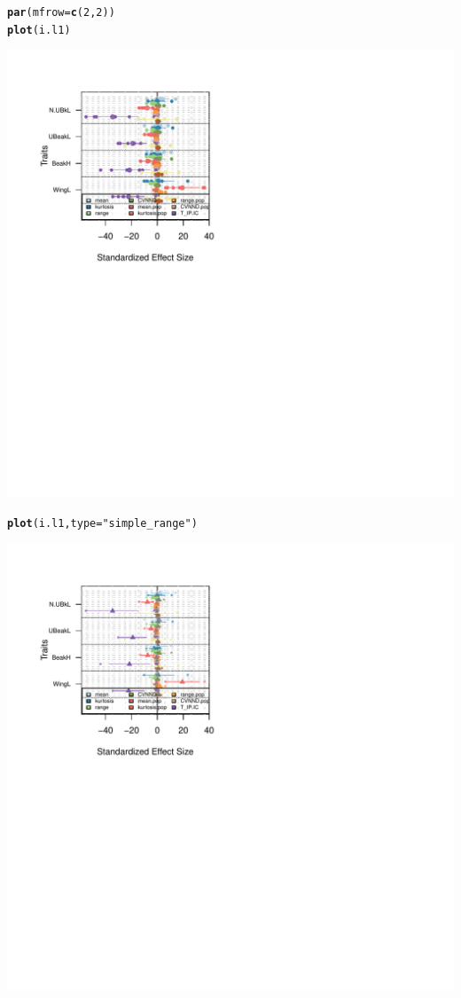 \documentclass[12pt]{article}\usepackage[]{graphicx}\usepackage[]{color}
\makeatletter
\def\maxwidth{ %
  \ifdim\Gin@nat@width>\linewidth
    \linewidth
  \else
    \Gin@nat@width
  \fi
}
\newcommand{\hlnum}[1]{\textcolor[rgb]{0.686,0.059,0.569}{#1}}%
\newcommand{\hlstr}[1]{\textcolor[rgb]{0.192,0.494,0.8}{#1}}%
\newcommand{\hlstd}[1]{\textcolor[rgb]{0.345,0.345,0.345}{#1}}%
\newcommand{\hlkwc}[1]{\textcolor[rgb]{0.333,0.667,0.333}{#1}}%
\newcommand{\hlkwd}[1]{\textcolor[rgb]{0.737,0.353,0.396}{\textbf{#1}}}%
\newenvironment{kframe}{%
 \def\at@end@of@kframe{}%
 \ifinner\ifhmode%
  \def\at@end@of@kframe{\end{minipage}}%
  \begin{minipage}{\columnwidth}%
 \fi\fi%
 \def\FrameCommand##1{\hskip\@totalleftmargin \hskip-\fboxsep
 \colorbox{shadecolor}{##1}\hskip-\fboxsep
     \hskip-\linewidth \hskip-\@totalleftmargin \hskip\columnwidth}%
 \MakeFramed {\advance\hsize-\width
   \@totalleftmargin\z@ \linewidth\hsize
   \@setminipage}}%
 {\par\unskip\endMakeFramed%
 \at@end@of@kframe}
\newenvironment{knitrout}{}{} %
\makeatother
\begin{document}
\begin{knitrout}
\color{fgcolor}\begin{kframe}
\begin{alltt}
\hlkwd{par}\hlstd{(}\hlkwc{mfrow} \hlstd{=} \hlkwd{c}\hlstd{(}\hlnum{2}\hlstd{,}\hlnum{2}\hlstd{))}
\hlkwd{plot}\hlstd{(i.l1)}
\end{alltt}
\end{kframe}
\includegraphics[width=\maxwidth]{figure/unnamed-chunk-501} 
\begin{kframe}\begin{alltt}
\hlkwd{plot}\hlstd{(i.l1,}\hlkwc{type} \hlstd{=} \hlstr{"simple_range"}\hlstd{)}
\end{alltt}
\end{kframe}
\includegraphics[width=\maxwidth]{figure/unnamed-chunk-502} 

\end{knitrout}
\end{document}
